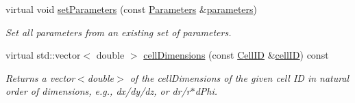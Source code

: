 \begin{DoxyCompactItemize}
virtual void \hyperlink{class_d_d4hep_1_1_d_d_segmentation_1_1_segmentation_af02e320c944cc14b394f1014a8538cfa}{set\+Parameters} (const \hyperlink{namespace_d_d4hep_1_1_d_d_segmentation_af38026430ca0e1ef64acdfc898f5dd3d}{Parameters} \&\hyperlink{class_d_d4hep_1_1_d_d_segmentation_1_1_segmentation_a1920fda919c1215aa4a76b74fd3b099b}{parameters})
\begin{DoxyCompactList}\small\item\em Set all parameters from an existing set of parameters. \end{DoxyCompactList}\item 
virtual std\+::vector$<$ double $>$ \hyperlink{class_d_d4hep_1_1_d_d_segmentation_1_1_segmentation_ac2119ba64c9805751e08b6100ef6fee6}{cell\+Dimensions} (const \hyperlink{namespace_d_d4hep_1_1_d_d_segmentation_ac7af071d85cb48820914434a07e21ba1}{Cell\+ID} \&\hyperlink{class_d_d4hep_1_1_d_d_segmentation_1_1_segmentation_ad5a60953d96d409850d8192f64f8ce3c}{cell\+ID}) const
\begin{DoxyCompactList}\small\item\em Returns a vector$<$double$>$ of the cell\+Dimensions of the given cell ID in natural order of dimensions, e.\+g., dx/dy/dz, or dr/r$\ast$d\+Phi. \end{DoxyCompactList}\end{DoxyCompactItemize}
